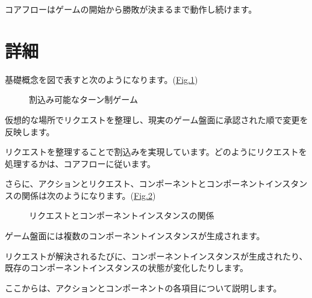 \documentclass[letterpaper,10pt,dvipdfmx]{sphinxmanual}
\begin{document}
\sphinxAtStartPar
コアフローはゲームの開始から勝敗が決まるまで動作し続けます。


\section{詳細}
\label{\detokenize{core/core:id11}}
\sphinxAtStartPar
基礎概念を図で表すと次のようになります。(\hyperref[\detokenize{core/core:abstract-core-image}]{Fig.\@ \ref{\detokenize{core/core:abstract-core-image}}})

\begin{figure}[htbp]
\centering
\capstart

\noindent{}
\caption{割込み可能なターン制ゲーム}\label{\detokenize{core/core:id34}}\label{\detokenize{core/core:abstract-core-image}}\end{figure}

\sphinxAtStartPar
仮想的な場所でリクエストを整理し、現実のゲーム盤面に承認された順で変更を反映します。

\sphinxAtStartPar
リクエストを整理することで割込みを実現しています。どのようにリクエストを処理するかは、コアフローに従います。

\sphinxAtStartPar
さらに、アクションとリクエスト、コンポーネントとコンポーネントインスタンスの関係は次のようになります。(\hyperref[\detokenize{core/core:action-request-image}]{Fig.\@ \ref{\detokenize{core/core:action-request-image}}})

\begin{figure}[htbp]
\centering
\capstart

\noindent{}
\caption{リクエストとコンポーネントインスタンスの関係}\label{\detokenize{core/core:id35}}\label{\detokenize{core/core:action-request-image}}\end{figure}

\sphinxAtStartPar
ゲーム盤面には複数のコンポーネントインスタンスが生成されます。

\sphinxAtStartPar
リクエストが解決されるたびに、コンポーネントインスタンスが生成されたり、既存のコンポーネントインスタンスの状態が変化したりします。

\sphinxAtStartPar
ここからは、アクションとコンポーネントの各項目について説明します。
\end{document}
